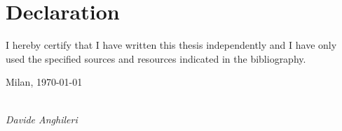 \pagestyle{empty}
\chapter*{Declaration}




\vspace*{2cm}
\noindent
I hereby certify that I have written this thesis independently and I have only used the specified sources and resources indicated in the bibliography.

\vspace{2cm}

\noindent
Milan, \today

\vspace{3cm}

\hspace*{7cm}%
\dotfill\\
\hspace*{8.5cm}%
\textit{Davide Anghileri}